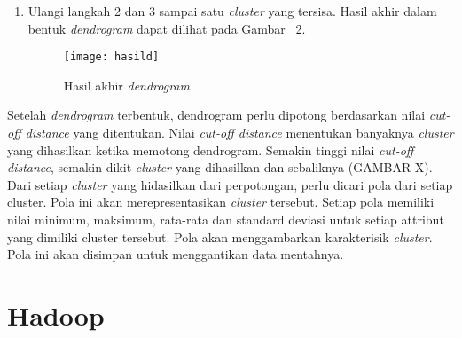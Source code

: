 \begin{enumerate}
\begin{align} 
d(A,C) & = \sqrt{(2 - 2)^2+(4 - 6)^2} \\
& = 4.47 
\end{align}
\begin{align} 
d(B,C) & = \sqrt{(2 - 3)^2+(4 - 6)^2} \\
& = 3.61 
\end{align}\\


Karena nilai 3.61 lebih kecil dari 4.47, maka nilai 3.61 diambil sebagai hasil. Contoh hasil dapat dilihat pada Gambar ~\ref{fig:step3}. 

\begin{figure}[H]
    \centering  
    \texttt{[image: step3]}  
    \caption[Hasil rekalkulasi]{Hasil rekalkulasi} 
    \label{fig:step3} 
\end{figure}

\item Ulangi langkah 2 dan 3 sampai satu \textit{cluster} yang tersisa. Hasil akhir dalam bentuk \textit{dendrogram} dapat dilihat pada Gambar ~\ref{fig:hasild}.

\begin{figure}[H]
    \centering  
    \texttt{[image: hasild]}  
    \caption[Hasil akhir \textit{dendrogram} ]{Hasil akhir \textit{dendrogram}} 
    \label{fig:hasild} 
\end{figure}

\end{enumerate}

Setelah \textit{dendrogram} terbentuk, dendrogram perlu dipotong berdasarkan nilai \textit{cut-off distance} yang ditentukan. Nilai \textit{cut-off distance} menentukan banyaknya \textit{cluster} yang dihasilkan ketika memotong dendrogram. Semakin tinggi nilai \textit{cut-off distance}, semakin dikit \textit{cluster} yang dihasilkan dan sebaliknya (GAMBAR X). Dari setiap \textit{cluster} yang hidasilkan dari perpotongan, perlu dicari pola dari setiap cluster. Pola ini akan merepresentasikan \textit{cluster} tersebut. Setiap pola memiliki nilai minimum, maksimum, rata-rata dan standard deviasi untuk setiap attribut yang dimiliki cluster tersebut. Pola akan menggambarkan karakterisik \textit{cluster}. Pola ini akan disimpan untuk menggantikan data mentahnya.

\section{Hadoop}

